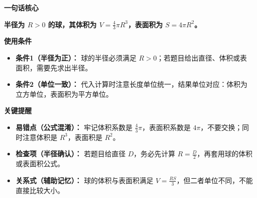 \begin{summarybox}
\textbf{\textcolor{CSummary}{一句话核心}}

\textbf{半径为 $R>0$ 的球，其体积为 $V = \frac{4}{3}\pi R^{3}$，表面积为 $S = 4\pi R^{2}$。}

\medskip
\textbf{\textcolor{CSummary}{使用条件}}
\begin{itemize}[leftmargin=*, itemsep=0.5em, topsep=0.4em]
\item \textbf{条件1（半径为正）：} 球的半径必须满足 $R>0$；若题目给出直径、体积或表面积，需要先求出半径。
\item \textbf{条件2（单位一致）：} 代入计算时注意长度单位统一，结果单位对应：体积为立方单位，表面积为平方单位。
\end{itemize}

\medskip
\textbf{\textcolor{CSummary}{关键提醒}}
\begin{itemize}[leftmargin=*, itemsep=0.5em, topsep=0.4em]
\item \textbf{易错点（公式混淆）：} 牢记体积系数是 $\frac{4}{3}\pi$，表面积系数是 $4\pi$，不要交换；同时注意体积是 $R^{3}$，表面积是 $R^{2}$。
\item \textbf{检查项（半径确认）：} 若题目给直径 $D$，务必先计算 $R=\frac{D}{2}$，再套用球的体积或表面积公式。
\item \textbf{关系式（辅助记忆）：} 球的体积与表面积满足 $V=\frac{RS}{3}$，但二者单位不同，不能直接比较大小。
\end{itemize}
\end{summarybox}